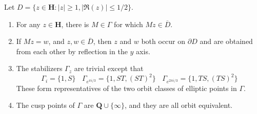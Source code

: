 \begin{theorem}
    Let $D = \{ z \in \mathbf{H} : |z| \geq 1, |\Re(z)| \leq 1/2 \}$.
    \begin{enumerate}
        \item For any $z \in \mathbf{H}$, there is $M \in \Gamma$ for which $Mz \in \overline{D}$.
        \item If $Mz = w$, and $z,w \in \overline{D}$, then $z$ and $w$ both occur on $\partial D$ and are obtained from each other by reflection in the $y$ axis.
        \item The stabilizers $\Gamma_z$ are trivial except that
        \[ \Gamma_i = \{ 1, S \}\ \ \ \ \Gamma_{e^{\pi i/3}} = \{ 1, ST, (ST)^2 \}\ \ \ \ \Gamma_{e^{2 \pi i/3}} = \{ 1, TS, (TS)^2 \} \]
        These form representatives of the two orbit classes of elliptic points in $\Gamma$.

        \item The cusp points of $\Gamma$ are $\mathbf{Q} \cup \{ \infty \}$, and they are all orbit equivalent.
    \end{enumerate}
\end{theorem}
